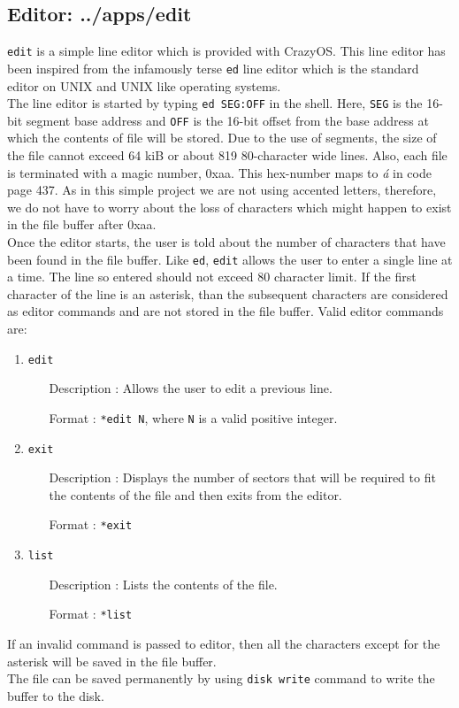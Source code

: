 \subsection{Editor: ../apps/edit}
\texttt{edit} is a simple line editor which is provided with CrazyOS. This line editor has been inspired from the infamously terse \texttt{ed} line editor which is the standard editor on UNIX and UNIX like operating systems.\\
The line editor is started by typing \texttt{ed SEG:OFF} in the shell. Here, \texttt{SEG} is the 16-bit segment base address and \texttt{OFF} is the 16-bit offset from the base address at which the contents of file will be stored. Due to the use of segments, the size of the file cannot exceed 64 kiB or about 819 80-character wide lines. Also, each file is terminated with a magic number, 0xaa. This hex-number maps to \textit{á} in code page 437. As in this simple project we are not using accented letters, therefore, we do not have to worry about the loss of characters which might happen to exist in the file buffer after 0xaa.\\
Once the editor starts, the user is told about the number of characters that have been found in the file buffer. Like \texttt{ed}, \texttt{edit} allows the user to enter a single line at a time. The line so entered should not exceed 80 character limit. If the first character of the line is an asterisk, than the subsequent characters are considered as editor commands and are not stored in the file buffer. Valid editor commands are:
\begin{enumerate}
  \item \texttt{edit}
  		\begin{enumerate}[align=parleft, labelsep=2cm, leftmargin=1.06in]
  		  \item[Description]: Allows the user to edit a previous line.
  		  \item[Format]: \texttt{*edit N}, where \texttt{N} is a valid positive integer. 
  		\end{enumerate}
  \item \texttt{exit}
  		\begin{enumerate}[align=parleft, labelsep=2cm, leftmargin=1.06in]
  		  \item[Description]: Displays the number of sectors that will be required to fit the contents of the file and then exits from the editor.
  		  \item[Format]: \texttt{*exit}
  		\end{enumerate}
  \item \texttt{list}
  		\begin{enumerate}[align=parleft, labelsep=2cm, leftmargin=1.06in]
  		  \item[Description]: Lists the contents of the file.
  		  \item[Format]: \texttt{*list}
  		\end{enumerate}
\end{enumerate}
If an invalid command is passed to editor, then all the characters except for the asterisk will be saved in the file buffer.\\
The file can be saved permanently by using \texttt{disk write} command to write the buffer to the disk. 


